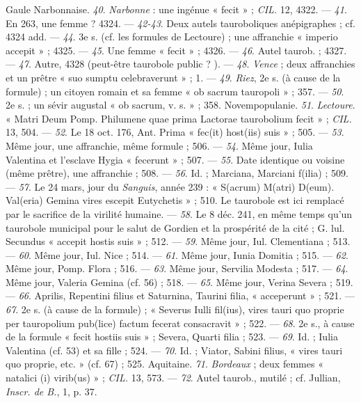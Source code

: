 \documentclass[a4paper, 11pt, oneside, polutonikogreek, french]{article}
\begin{document}
Gaule Narbonnaise. \emph{40}. \emph{Narbonne} : une ingénue « fecit » ; \emph{CIL.} 12, 4322. --- \emph{41}. En 263, une femme ? 4324. --- \emph{42-43}. Deux autels tauroboliques anépigraphes ; cf. 4324 add. --- \emph{44}. 3e s. (cf. les formules de Lectoure) ; une affranchie « imperio accepit » ; 4325. --- \emph{45}. Une femme « fecit » ; 4326. --- \emph{46}. Autel taurob. ; 4327. --- \emph{47}. Autre, 4328 (peut-être taurobole public ? ). --- \emph{48}. \emph{Vence} ; deux affranchies et un prêtre « suo sumptu celebraverunt » ; 1. --- \emph{49}. \emph{Riez}, 2e s. (à cause de la formule) ; un citoyen romain et sa femme « ob sacrum tauropoli » ; 357. --- \emph{50}. 2e s. ; un sévir augustal « ob sacrum, v. s. » ; 358.  
Novempopulanie. \emph{51}. \emph{Lectoure}. « Matri Deum Pomp. Philumene quae prima Lactorae taurobolium fecit » ; \emph{CIL.} 13, 504. --- \emph{52}. Le 18 oct. 176, Ant. Prima « fec(it) host(iis) suis » ; 505. --- \emph{53}. Même jour, une affranchie, même formule ; 506. --- \emph{54}. Même jour, Iulia Valentina et l'esclave Hygia « fecerunt » ; 507. --- \emph{55}. Date identique ou voisine (même prêtre), une affranchie ; 508. --- \emph{56}. Id. ; Marciana, Marciani f(ilia) ; 509. --- \emph{57}. Le 24 mars, jour du \emph{Sanguis}, année 239 : « S(acrum) M(atri) D(eum). Val(eria) Gemina vires escepit Eutychetis » ; 510. Le taurobole est ici remplacé par le sacrifice de la virilité humaine. --- \emph{58}. Le 8 déc. 241, en même temps qu'un taurobole municipal pour le salut de Gordien et la prospérité de la cité ; G. lul. Secundus « accepit hostis suis » ; 512. --- \emph{59}. Même jour, Iul. Clementiana ; 513. --- \emph{60}. Même jour, Iul. Nice ; 514. --- \emph{61}. Même jour, Iunia Domitia ; 515. --- \emph{62}. Même jour, Pomp. Flora ; 516. --- \emph{63}. Même jour, Servilia Modesta ; 517. --- \emph{64}. Même jour, Valeria Gemina (cf. 56) ; 518. --- \emph{65}. Même jour, Verina Severa ; 519. --- \emph{66}. Aprilis, Repentini filius et Saturnina, Taurini filia, « acceperunt » ; 521. --- \emph{67}. 2e s. (à cause de la formule) ; « Severus Iulli fil(ius), vires tauri quo proprie per tauropolium pub(lice) factum fecerat consacravit » ; 522. --- \emph{68}. 2e s., à cause de la formule « fecit hostiis suis » ; Severa, Quarti filia ; 523. --- \emph{69}. Id. ; Iulia Valentina (cf. 53) et sa fille ; 524. --- \emph{70}. Id. ; Viator, Sabini filius, « vires tauri quo proprie, etc. » (cf. 67) ; 525.  
Aquitaine. \emph{71}. \emph{Bordeaux} ; deux femmes « natalici (i) virib(us) » ; \emph{CIL.} 13, 573. --- \emph{72}. Autel taurob., mutilé ; cf. Jullian, \emph{Inscr. de B.}, 1, p. 37.  
\end{document}
